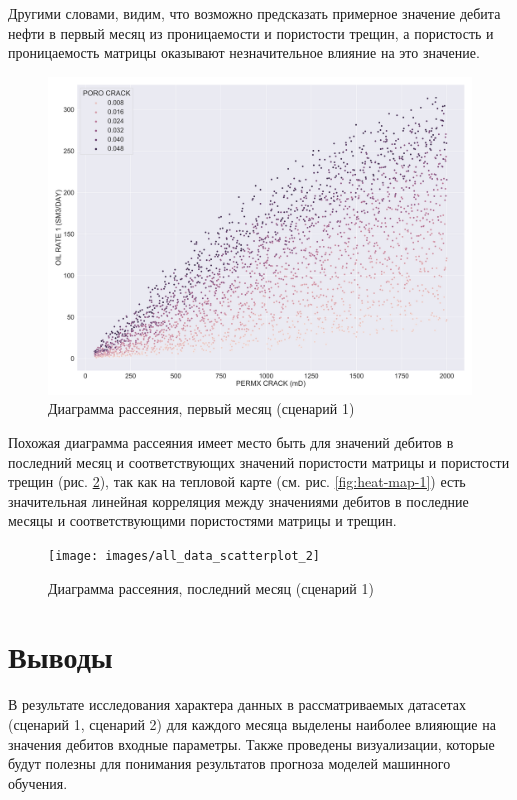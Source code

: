 Другими словами, видим, что возможно предсказать примерное значение дебита нефти в первый месяц из проницаемости и пористости трещин, а пористость и проницаемость матрицы оказывают незначительное влияние на это значение.
\begin{figure}[H] 
	\center
	\includegraphics[width=\textwidth]{images/all_data_scatterplot_1}
	\caption{Диаграмма рассеяния, первый месяц (сценарий 1)} 
	\label{fig:scatter-1}
\end{figure}

Похожая диаграмма рассеяния имеет место быть для значений дебитов в последний месяц и соответствующих значений пористости матрицы и пористости трещин (рис. \ref{fig:scatter-2}), так как на тепловой карте (см. рис. \ref{fig:heat-map-1}) есть значительная линейная корреляция между значениями дебитов в последние месяцы и соответствующими пористостями матрицы и трещин.

\begin{figure}[H] 
	\center
	\texttt{[image: images/all\_data\_scatterplot\_2]}
	\caption{Диаграмма рассеяния, последний месяц (сценарий 1)} 
	\label{fig:scatter-2}
\end{figure}


\section{Выводы} \label{ch1:conclusion}

В результате исследования характера данных в рассматриваемых датасетах (сценарий 1, сценарий 2) для каждого месяца выделены наиболее влияющие на значения дебитов входные параметры. Также проведены визуализации, которые будут полезны для понимания результатов прогноза моделей машинного обучения. 

